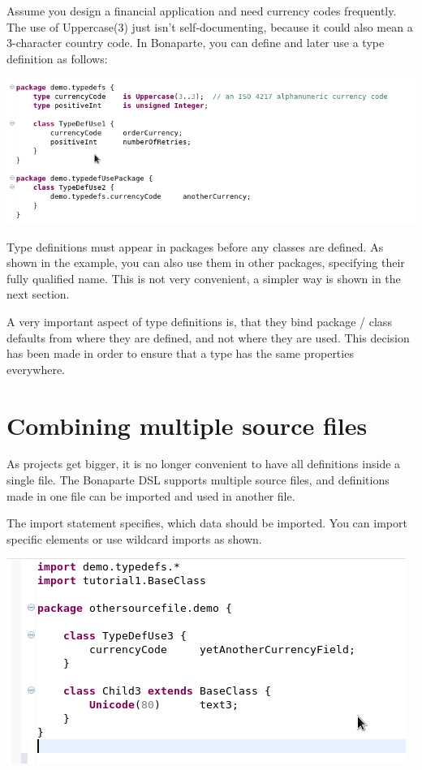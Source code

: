\documentclass[11pt,a4paper,oneside]{article}
\begin{document}
Assume you design a financial application and need currency codes frequently. The use of {\ttfamily Uppercase(3)} just isn't self-documenting, because it could
also mean a 3-character country code.
In Bonaparte, you can define and later use a type definition as follows:

\vspace{2mm}

\hspace{1cm}\includegraphics[scale=0.5]{images/tut1-010-typedefs.png}

\noindent 
Type definitions must appear in packages before any classes are defined. As shown in the example, you can also use them in other packages,
specifying their fully qualified name. This is not very convenient, a simpler way is shown in the next section.

A very important aspect of type definitions is, that they bind package / class defaults from where they are defined, and not where they are used.
This decision has been made in order to ensure that a type has the same properties everywhere. 
 
 
\section{Combining multiple source files}
As projects get bigger, it is no longer convenient to have all definitions inside a single file.
The Bonaparte DSL supports multiple source files, and definitions made in one file can be imported and used in another file.


The {\ttfamily import } statement specifies, which data should be imported. You can import specific elements or use wildcard imports as shown.

\vspace{2mm}

\hspace{1cm}\includegraphics[scale=0.5]{images/tut1-011-imports.png}
 
\end{document}
